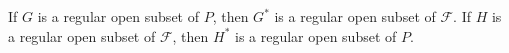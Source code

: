 If $G$ is a regular open subset of $P$, then $G^*$ is a regular open subset of $\mathcal{F}$. If $H$ is a regular open subset of $\mathcal{F}$, then $H^*$ is a regular open subset of $P$.
